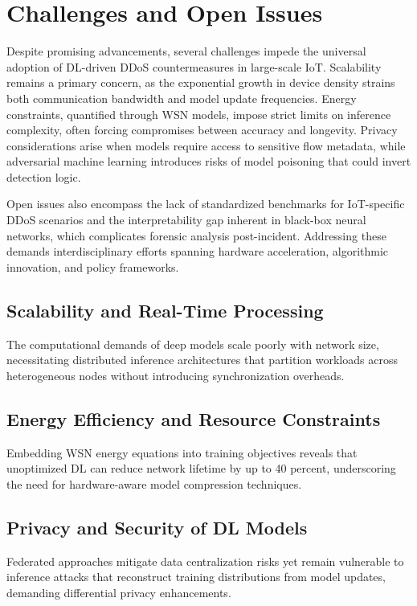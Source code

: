 \documentclass[12pt]{article}
\begin{document}
\section{Challenges and Open Issues}

Despite promising advancements, several challenges impede the universal adoption of DL-driven DDoS countermeasures in large-scale IoT. Scalability remains a primary concern, as the exponential growth in device density strains both communication bandwidth and model update frequencies. Energy constraints, quantified through WSN models, impose strict limits on inference complexity, often forcing compromises between accuracy and longevity. Privacy considerations arise when models require access to sensitive flow metadata, while adversarial machine learning introduces risks of model poisoning that could invert detection logic.

Open issues also encompass the lack of standardized benchmarks for IoT-specific DDoS scenarios and the interpretability gap inherent in black-box neural networks, which complicates forensic analysis post-incident. Addressing these demands interdisciplinary efforts spanning hardware acceleration, algorithmic innovation, and policy frameworks.

\subsection{Scalability and Real-Time Processing}

The computational demands of deep models scale poorly with network size, necessitating distributed inference architectures that partition workloads across heterogeneous nodes without introducing synchronization overheads.

\subsection{Energy Efficiency and Resource Constraints}

Embedding WSN energy equations into training objectives reveals that unoptimized DL can reduce network lifetime by up to 40 percent, underscoring the need for hardware-aware model compression techniques.

\subsection{Privacy and Security of DL Models}

Federated approaches mitigate data centralization risks yet remain vulnerable to inference attacks that reconstruct training distributions from model updates, demanding differential privacy enhancements.
\end{document}

